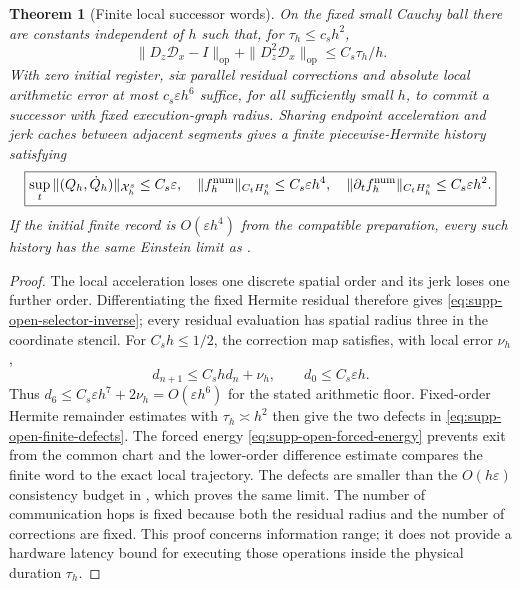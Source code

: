 \documentclass[11pt]{article}
\newtheorem{theorem}{Theorem}[section]
\theoremstyle{definition}
\theoremstyle{remark}
\newcommand{\op}{\mathrm{op}}
\begin{document}
\begin{theorem}[Finite local successor words]
\label{thm:supp-open-finite-words}
On the fixed small Cauchy ball there are constants independent of $h$ such
that, for $\tau_h\le c_sh^2$,
\begin{equation}
 \|D_z\mathscr D_x-I\|_{\op}+\|D_z^2\mathscr D_x\|_{\op}
 \le C_s\tau_h/h.
 \label{eq:supp-open-selector-inverse}
\end{equation}
With zero initial register, six parallel residual corrections and absolute
local arithmetic error at most $c_s\varepsilon h^6$ suffice, for all
sufficiently small $h$, to commit a successor with fixed execution-graph
radius.  Sharing endpoint acceleration and jerk caches between adjacent
segments gives a finite piecewise-Hermite history satisfying
\begin{equation}
 \boxed{
 \sup_t\|(Q_h,\dot Q_h)\|_{\mathcal X_h^s}\le C_s\varepsilon,
 \quad \|f_h^{\rm num}\|_{C_tH_h^s}\le C_s\varepsilon h^4,
 \quad \|\partial_tf_h^{\rm num}\|_{C_tH_h^s}\le C_s\varepsilon h^2.}
 \label{eq:supp-open-finite-defects}
\end{equation}
If the initial finite record is $O(\varepsilon h^4)$ from the compatible
preparation, every such history has the same Einstein limit as
.
\end{theorem}
\begin{proof}
The local acceleration loses one discrete spatial order and its jerk loses
one further order.  Differentiating the fixed Hermite residual therefore gives
\eqref{eq:supp-open-selector-inverse}; every residual evaluation has spatial
radius three in the coordinate stencil.  For $C_sh\le1/2$, the correction
map satisfies, with local error $\nu_h$,
\[
 d_{n+1}\le C_shd_n+\nu_h,
 \qquad d_0\le C_s\varepsilon h.
\]
Thus
$d_6\le C_s\varepsilon h^7+2\nu_h=O(\varepsilon h^6)$ for the stated
arithmetic floor.  Fixed-order Hermite remainder estimates with
$\tau_h\asymp h^2$ then give the two defects in
\eqref{eq:supp-open-finite-defects}.  The forced energy
\eqref{eq:supp-open-forced-energy} prevents exit from the common chart and the
lower-order difference estimate compares the finite word to the exact local
trajectory.  The defects are smaller than the $O(h\varepsilon)$ consistency
budget in , which proves the same limit.  The
number of communication hops is fixed because both the residual radius and
the number of corrections are fixed.  This proof concerns information range;
it does not provide a hardware latency bound for executing those operations
inside the physical duration $\tau_h$.
\end{proof}
\end{document}
